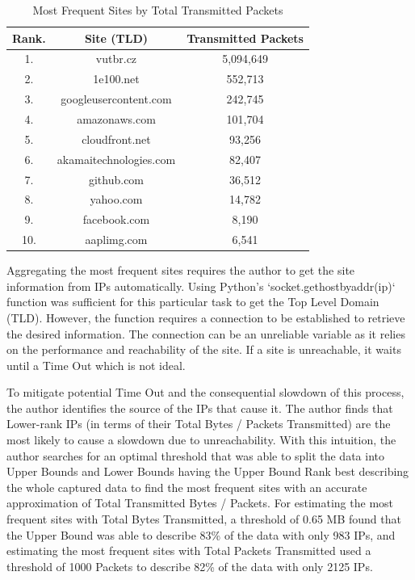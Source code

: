 \documentclass{article}
\begin{document}
\begin{table}[H]
    \centering
    \begin{tabular}{ccc}
         Rank. & Site (TLD) & Transmitted Packets\\
         \hline
         1. & vutbr.cz & 5,094,649 \\
         2. & 1e100.net & 552,713 \\
         3. & googleusercontent.com & 242,745 \\
         4. & amazonaws.com & 101,704 \\
         5. & cloudfront.net & 93,256 \\
         6. & akamaitechnologies.com & 82,407 \\
         7. & github.com & 36,512 \\
         8. & yahoo.com & 14,782 \\
         9. & facebook.com & 8,190 \\
         10. & aaplimg.com & 6,541 \\
    \end{tabular}
    \caption{Most Frequent Sites by Total Transmitted Packets}
    \label{tab:nfsite-packets}
\end{table}

Aggregating the most frequent sites requires the author to get the site information from IPs automatically. Using Python's `socket.gethostbyaddr(ip)` function was sufficient for this particular task to get the Top Level Domain (TLD). However, the function requires a connection to be established to retrieve the desired information. The connection can be an unreliable variable as it relies on the performance and reachability of the site. If a site is unreachable, it waits until a Time Out which is not ideal.

To mitigate potential Time Out and the consequential slowdown of this process, the author identifies the source of the IPs that cause it. The author finds that Lower-rank IPs (in terms of their Total Bytes / Packets Transmitted) are the most likely to cause a slowdown due to unreachability. With this intuition, the author searches for an optimal threshold that was able to split the data into Upper Bounds and Lower Bounds having the Upper Bound Rank best describing the whole captured data to find the most frequent sites with an accurate approximation of Total Transmitted Bytes / Packets. For estimating the most frequent sites with Total Bytes Transmitted, a threshold of 0.65 MB found that the Upper Bound was able to describe 83\% of the data with only 983 IPs, and estimating the most frequent sites with Total Packets Transmitted used a threshold of 1000 Packets to describe 82\% of the data with only 2125 IPs.
\end{document}
